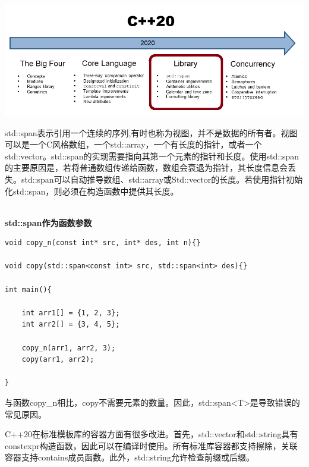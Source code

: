 

\begin{center}
\includegraphics[width=1.0\textwidth]{content/2/chapter3/images/6.png}\\
\end{center}


std::span表示引用一个连续的序列,有时也称为视图，并不是数据的所有者。视图可以是一个C风格数组，一个std::array，一个有长度的指针，或者一个std::vector。std::span的实现需要指向其第一个元素的指针和长度。使用std::span的主要原因是，若将普通数组传递给函数，数组会衰退为指针，其长度信息会丢失。std::span可以自动推导数组、std::array或Std::vector的长度。若使用指针初始化std::span，则必须在构造函数中提供其长度。

\hspace*{\fill} \\ %
\noindent
\textbf{std::span作为函数参数}
\begin{lstlisting}[style=styleCXX]
void copy_n(const int* src, int* des, int n){}

void copy(std::span<const int> src, std::span<int> des){}

int main(){
	
	int arr1[] = {1, 2, 3};
	int arr2[] = {3, 4, 5};
	
	copy_n(arr1, arr2, 3);
	copy(arr1, arr2);
	
}
\end{lstlisting}

与函数copy\_n相比，copy不需要元素的数量。因此，std::span<T>是导致错误的常见原因。


C++20在标准模板库的容器方面有很多改进。首先，std::vector和std::string具有constexpr构造函数，因此可以在编译时使用。所有标准库容器都支持擦除，关联容器支持contains成员函数。此外，std::string允许检查前缀或后缀。

